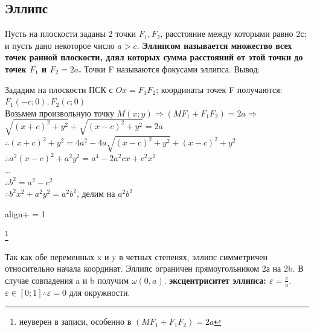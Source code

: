 \documentclass[oneside]{book}
\newcommand{\boxedeq}[2]{\begin{empheq}[box={\fboxsep=6pt\fbox}]{align}\label{#1}#2\end{empheq}}
\begin{document}
\begin{enumerate}
\subsection{Эллипс}
Пусть на плоскости заданы 2 точки $F_1, F_2$, расстояние между которыми равно 2с; и пусть дано
некоторое число $a > c$. \textbf{Эллипсом называется множество всех точек ранной плоскости, длял которых
сумма расстояний от этой точки до точек $F_1$ и $F_2 = 2a$.} Точки F называются фокусами эллипса. Вывод:
\begin{center}
        Зададим на плоскости ПСК с $Ox = F_1F_2$; координаты точек F получаются: $F_1(-c; 0), F_2(c; 0)$ \\
        Возьмем произвольную точку $M(x; y) \Rightarrow (MF_1 + F_1F_2) = 2a \Rightarrow$ \\
        $\sqrt{(x+c)^2 + y^2} + \sqrt{(x-c)^2 + y^2} = 2a$ \\
        $\therefore (x+c)^2 + y^2 = 4a^2 - 4a\sqrt{(x-c)^2 + y^2} + (x-c)^2 + y^2$ \\
        $\therefore a^2(x-c)^2+a^2y^2 = a^4 - 2a^2cx+c^2x^2$ \\
        \dots \\
        $\therefore b^2 = a^2 - c^2$ \\
        $\therefore b^2x^2 + a^2y^2 = a^2b^2$, делим на $a^2b^2$ \\
        \boxedeq{eq:*}{+ = 1}\footnote{неуверен в записи, особенно в $(MF_1 + F_1F_2) = 2a$}
\end{center}
Так как обе переменных x и y в четных степенях, эллипс симметричен относительно начала координат.
Эллипс ограничен прямоугольником 2а на 2b. В случае совпадения a и b получим $\omega(0, a)$.
\textbf{эксцентриситет эллипса: $\varepsilon = \frac{c}{a}$}. $\varepsilon \in [0; 1] \therefore \varepsilon = 0$ для окружности.


\end{enumerate}
\end{document}
